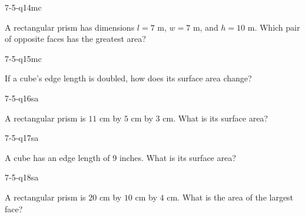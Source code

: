 \begin{practiceQuestion}{7-5-q14}{mc}
\begin{questionText}
A rectangular prism has dimensions $l = 7$ m, $w = 7$ m, and $h = 10$ m. Which pair of opposite faces has the greatest area?
\end{questionText}
\end{practiceQuestion}

\begin{practiceQuestion}{7-5-q15}{mc}
\begin{questionText}
If a cube's edge length is doubled, how does its surface area change?
\end{questionText}
\end{practiceQuestion}


\begin{practiceQuestion}{7-5-q16}{sa}
\begin{questionText}
A rectangular prism is $11$ cm by $5$ cm by $3$ cm. What is its surface area?
\end{questionText}
\end{practiceQuestion}

\begin{practiceQuestion}{7-5-q17}{sa}
\begin{questionText}
A cube has an edge length of $9$ inches. What is its surface area?
\end{questionText}
\end{practiceQuestion}

\begin{practiceQuestion}{7-5-q18}{sa}
\begin{questionText}
A rectangular prism is $20$ cm by $10$ cm by $4$ cm. What is the area of the largest face?
\end{questionText}
\end{practiceQuestion}

